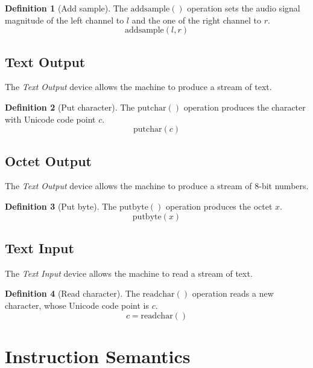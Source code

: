 \documentclass[a4paper,10pt]{article}
\newcommand{\PutByte}[1]{\mathrm{putbyte}(#1)}
\newcommand{\PutChar}[1]{\mathrm{putchar}(#1)}
\newcommand{\ReadChar}[1]{\mathrm{readchar}(#1)}
\newcommand{\AddSample}[1]{\mathrm{addsample}(#1)}
\theoremstyle{definition}
\newtheorem{definition}{Definition}
\begin{document}
\begin{definition}[Add sample]
  The $\AddSample{}$ operation sets the audio signal magnitude of the left channel to $l$ and the one of the right channel to $r$.
\[ \AddSample{l, r} \]
\end{definition}

\subsection{Text Output}
\label{sec:text-output}

The \emph{Text Output} device allows the machine to produce a stream of text.

\begin{definition}[Put character]
  The $\PutChar{}$ operation produces the character with Unicode code point $c$.
  \[ \PutChar{c} \]
\end{definition}

\subsection{Octet Output}
\label{sec:octet-output}

The \emph{Text Output} device allows the machine to produce a stream of 8-bit numbers.

\begin{definition}[Put byte]
  The $\PutByte{}$ operation produces the octet $x$.
  \[ \PutByte{x} \]
\end{definition}

\subsection{Text Input}
\label{sec:text-input}

The \emph{Text Input} device allows the machine to read a stream of text.

\begin{definition}[Read character]
  The $\ReadChar{}$ operation reads a new character, whose Unicode code point is $c$.
  \[ c = \ReadChar{} \]
\end{definition}


\section{Instruction Semantics}
\label{sec:instruction-semantics}
\end{document}
